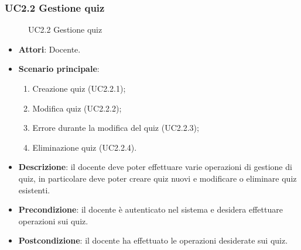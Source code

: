 \subsubsection{UC2.2 Gestione quiz}
\begin{figure}[H]
\centering
\noindent{}
\caption{UC2.2 Gestione quiz}
\end{figure}
\begin{itemize}
\item \textbf{Attori}: Docente.
\item \textbf{Scenario principale}:
\begin{enumerate}
\item Creazione quiz (UC2.2.1);
\item Modifica quiz (UC2.2.2);
\item Errore durante la modifica del quiz (UC2.2.3);
\item Eliminazione quiz (UC2.2.4).
\end{enumerate}
\item \textbf{Descrizione}: il docente deve poter effettuare varie operazioni di gestione di quiz, in particolare deve poter creare quiz nuovi e modificare o eliminare quiz esistenti.
\item \textbf{Precondizione}: il docente è autenticato nel sistema e desidera effettuare operazioni sui quiz.
\item \textbf{Postcondizione}: il docente ha effettuato le operazioni desiderate sui quiz.
\end{itemize}
